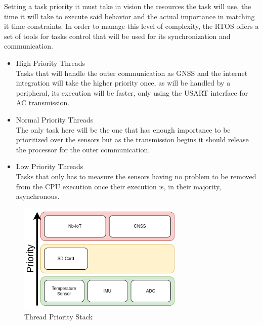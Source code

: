 Setting a task priority it must take in vision the resources the task will use, the time it will take to execute said behavior
and the actual importance in matching it time constraints. In order to manage this level of complexity, the RTOS offers a set of
tools for tasks control that will be used for its synchronization and communication.
\begin{itemize}
    \item High Priority Threads \\ 
    Tasks that will handle the outer communication as GNSS and the internet integration will take the higher priority once, as will be handled
    by a peripheral, its execution will be faster, only using the USART interface for AC transmission. 
    \item Normal Priority Threads \\
    The only task here will be the one that has enough importance to be prioritized over the sensors but as the transmission begins it should release the processor
    for the outer communication.
    \item Low Priority Threads \\
    Tasks that only has to measure the sensors having no problem to be removed from the CPU execution
    once their execution is, in their majority, asynchronous.
    
\end{itemize}

\begin{figure}[H]
    \centering
    \includegraphics[width=0.7\textwidth]{images/diagrams/threads/thread.drawio.png}  %
    \caption{Thread Priority Stack}
    \label{fig:Thread Priority Stack}        
\end{figure}

